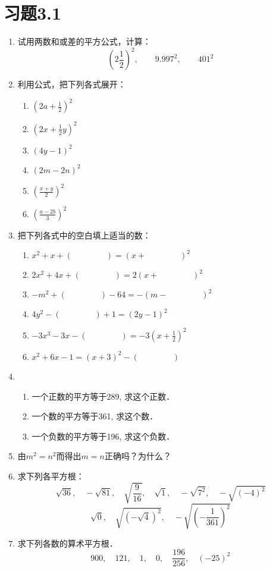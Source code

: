 \section*{习题3.1}
\begin{enumerate}
    \item 试用两数和或差的平方公式，计算：
\[\left(2\frac{1}{2}\right)^2,\qquad 9.997^2,\qquad 401^2\]
    \item 利用公式，把下列各式展开：
\begin{multicols}{2}
\begin{enumerate}
    \item $\left(2a+\frac{1}{2}\right)^2$
    \item $\left(2x+\frac{1}{2}y\right)^2$
    \item $(4y-1)^2$
    \item $(2m-2n)^2$
    \item $\left(\frac{x+y}{2}\right)^2$
    \item $\left(\frac{a-2b}{3}\right)^2$
\end{enumerate}
\end{multicols}
    \item 把下列各式中的空白填上适当的数：
\begin{enumerate}
    \item $x^2+x+(\qquad\qquad  )=(x+\qquad\qquad  )^2$
    \item $2x^2+4x+(\qquad\qquad   )=2(x+\qquad\qquad  )^2$
    \item $-m^2+(\qquad\qquad   )-64=-(m-\qquad\qquad  )^2$
    \item $4y^2-(\qquad\qquad  )+1=(2y-1)^2$
    \item $-3x^3-3x-(\qquad\qquad  )=-3\left(x+\frac{1}{2}\right)^2$
    \item $x^2+6x-1=(x+3)^2-(\qquad\qquad   )$
\end{enumerate}
    \item \begin{enumerate}
        \item 一个正数的平方等于289, 求这个正数．
        \item 一个数的平方等于361, 求这个数．
        \item 一个负数的平方等于196, 求这个负数．
    \end{enumerate}
    
\item 由$m^2=n^2$而得出$m=n$正确吗？为什么？
\item 求下列各平方根：
\[\sqrt{36},\quad -\sqrt{81},\quad \sqrt{\frac{9}{16}},\quad \sqrt{1},\quad -\sqrt{7^2},\quad -\sqrt{(-4)^2}\]
\[\sqrt{0},\quad \sqrt{(-\sqrt{4})^2},\quad -\sqrt{\left(-\frac{1}{361}\right)^2}\]
\item 求下列各数的算术平方根．
\[900,\quad 121,\quad 1,\quad 0,\quad \frac{196}{256},\quad (-25)^2\]


\end{enumerate}

